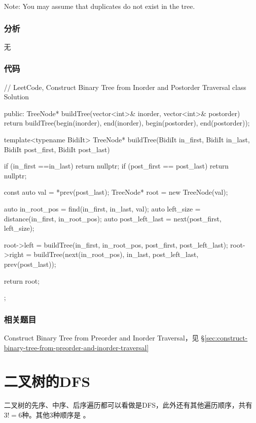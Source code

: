 Note:
You may assume that duplicates do not exist in the tree.


\subsubsection{分析}
无


\subsubsection{代码}
\begin{Code}
// LeetCode, Construct Binary Tree from Inorder and Postorder Traversal
class Solution {
public:
    TreeNode* buildTree(vector<int>& inorder, vector<int>& postorder) {
        return buildTree(begin(inorder), end(inorder),
                begin(postorder), end(postorder));
    }

    template<typename BidiIt>
    TreeNode* buildTree(BidiIt in_first, BidiIt in_last,
            BidiIt post_first, BidiIt post_last) {
        if (in_first ==in_last) return nullptr;
        if (post_first == post_last) return nullptr;

        const auto val = *prev(post_last);
        TreeNode* root = new TreeNode(val);

        auto in_root_pos = find(in_first, in_last, val);
        auto left_size = distance(in_first, in_root_pos);
        auto post_left_last = next(post_first, left_size);

        root->left = buildTree(in_first, in_root_pos, post_first, post_left_last);
        root->right = buildTree(next(in_root_pos), in_last, post_left_last,
                prev(post_last));

        return root;
    }
};
\end{Code}


\subsubsection{相关题目}
\begindot
\item Construct Binary Tree from Preorder and Inorder Traversal，见 \S \ref{sec:construct-binary-tree-from-preorder-and-inorder-traversal}
\myenddot


\section{二叉树的DFS} %
二叉树的先序、中序、后序遍历都可以看做是DFS，此外还有其他遍历顺序，共有$3!=6$种。其他3种顺序是 。


